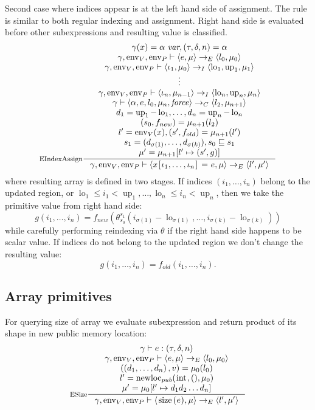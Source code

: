 \documentclass[a4paper, 10pt, draft]{report}
\DeclareMathOperator*{\env}{env}
\DeclareMathOperator*{\up}{up}
\DeclareMathOperator*{\lo}{lo}
\DeclareMathOperator*{\newloc}{newloc}
\DeclareMathOperator*{\force}{\mathit{force}}
\newcommand{\mycode}[1]{\ensuremath{\mbox{\lstinline{#1}}}}
\begin{document}
Second case where indices appear is at the left hand side of assignment. The
rule is similar to both regular indexing and assignment. Right hand side is
evaluated before other subexpressions and resulting value is classified.
\[ \inference[EIndexAssign]
{
  \gamma(x) = \alpha\ \textit{var}, \left( \tau, \delta, n \right) = \alpha \\
  \gamma, \env_V, \env_P |- \left< e, \mu \right> \to_E \left< l_0, \mu_0 \right> \\
  \gamma, \env_V, \env_P |- \left< \iota_1, \mu_0 \right> \to_I \left< \lo_1, \up_1, \mu_1 \right> \\
  \vdots \\
  \gamma, \env_V, \env_P |- \left< \iota_n, \mu_{n-1} \right> \to_I \left< \lo_n, \up_n, \mu_n \right> \\
  \gamma |- \left< \alpha, e, l_0, \mu_n, \force \right> \to_C \left<l_2, \mu_{n+1} \right> \\
  d_1 = \up_1 - \lo_1, \ldots, d_n = \up_n - \lo_n \\
  (s_0,f_{new}) = \mu_{n+1}(l_2) \\
  l' = \env_V(x), (s',f_{old}) = \mu_{n+1}(l') \\
  s_1 = (d_{\sigma(1)}, \ldots, d_{\sigma(k)}),  s_0 \sqsubseteq s_1 \\
  \mu' = \mu_{n+1}[l' \mapsto (s', g)]
}{
  \gamma, \env_V, \env_P |- \left< x\mycode{[}\iota_1, \ldots, \iota_n \mycode{]}\ \mycode{=}\ e, \mu \right> \to_E \left< l', \mu' \right>
} \]
where resulting array is defined in two stages. If indices $(i_1,\ldots,i_n)$
belong to the updated region, or $\lo_1 \leq i_1 < \up_1, \ldots, \lo_n \leq
i_n < \up_n $, then we take the primitive value from right hand side:
\[
g(i_1, \ldots, i_n) = f_{new}(\theta_{s_0}^{s_1}(i_{\sigma(1)}-\lo\nolimits_{\sigma(1)}, \ldots, i_{\sigma(k)}-\lo\nolimits_{\sigma(k)}))
\]
while carefully performing reindexing via $\theta$ if the right hand side happens to
be scalar value. If indices do not belong to the updated region we don't change
the resulting value:
\[
g(i_1, \ldots, i_n) = f_{old}(i_1, \ldots, i_n).
\]


\subsection{Array primitives}\label{sec:semantics:exp:arrays}

For querying size of array we evaluate subexpression and return product of its
shape in new public memory location:
\[ \inference[ESize]
{
    \gamma |- e : \left(\tau, \delta, n \right) \\
    \gamma, \env_V, \env_P |- \left< e, \mu \right> \to_E \left< l_0, \mu_0 \right> \\
    ( \left( d_1,\ldots,d_n \right), v ) = \mu_0(l_0) \\
    l' = \newloc_{pub}(\mycode{int}, (), \mu_0) \\
    \mu' = \mu_0[ l' \mapsto d_1 d_2 \ldots d_n ]
}{
  \gamma, \env_V, \env_P |- \left<\mycode{size(} e \mycode{)}, \mu \right> \to_E \left< l',  \mu' \right>
}\]
\end{document}
